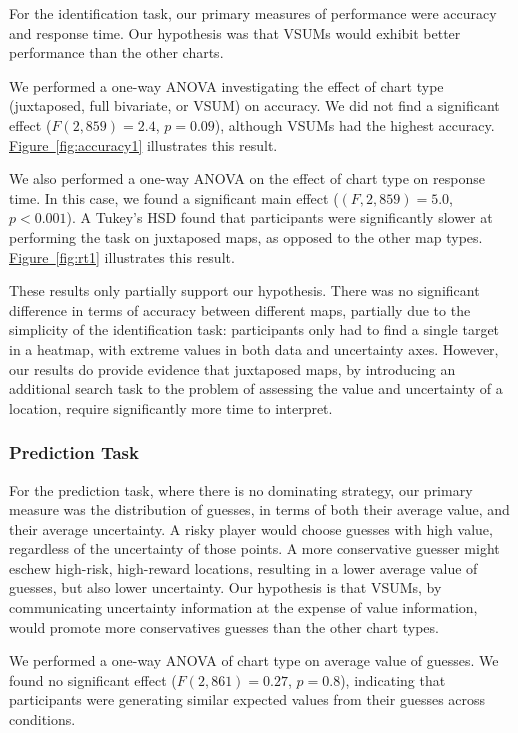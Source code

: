 \documentclass{vgtc}                          %
\newcommand{\figref}[1]{\hyperref[#1]{Figure~\ref*{#1}}}
\begin{document}
For the identification task, our primary measures of performance were accuracy and response time. Our hypothesis was that VSUMs would exhibit better performance than the other charts.

We performed a one-way ANOVA investigating the effect of chart type (juxtaposed, full bivariate, or VSUM) on accuracy. We did not find a significant effect ($F(2,859) = 2.4$, $p=0.09$), although VSUMs had the highest accuracy. \figref{fig:accuracy1} illustrates this result.

We also performed a one-way ANOVA on the effect of chart type on response time. In this case, we found a significant main effect ($(F,2,859) = 5.0$, $p<0.001$). A Tukey's HSD found that participants were significantly slower at performing the task on juxtaposed maps, as opposed to the other map types. \figref{fig:rt1} illustrates this result.

These results only partially support our hypothesis. There was no significant difference in terms of accuracy between different maps, partially due to the simplicity of the identification task: participants only had to find a single target in a heatmap, with extreme values in both data and uncertainty axes. However, our results do provide evidence that juxtaposed maps, by introducing an additional search task to the problem of assessing the value and uncertainty of a location, require significantly more time to interpret.

\subsubsection{Prediction Task}

\uncertaintyFig

For the prediction task, where there is no dominating strategy, our primary measure was the distribution of guesses, in terms of both their average value, and their average uncertainty. A risky player would choose guesses with high value, regardless of the uncertainty of those points. A more conservative guesser might eschew high-risk, high-reward locations, resulting in a lower average value of guesses, but also lower uncertainty. Our hypothesis is that VSUMs, by communicating uncertainty information at the expense of value information, would promote more conservatives guesses than the other chart types.

We performed a one-way ANOVA of chart type on average value of guesses. We found no significant effect ($F(2,861)=0.27$, $p=0.8$), indicating that participants were generating similar expected values from their guesses across conditions.
\end{document}
